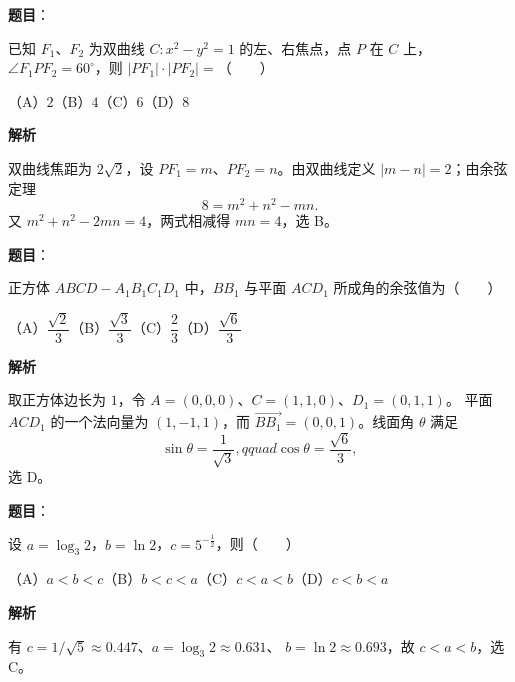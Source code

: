 \begin{answer}

\textbf{题目}：

已知 $F_1\text{、}F_2$ 为双曲线 $C:x^2-y^2=1$ 的左、右焦点，点 $P$ 在 $C$ 上，$\angle F_1PF_2=60^\circ$，则 $|PF_1|\cdot|PF_2|=$\mbox{（　　）}

（A）$2$\quad（B）$4$\quad（C）$6$\quad（D）$8$

\textbf{解析}

双曲线焦距为 $2\sqrt2$，设 $PF_1=m$、$PF_2=n$。由双曲线定义
$|m-n|=2$；由余弦定理
\nopagebreak[4]
\[
8=m^2+n^2-mn.
\]
又 $m^2+n^2-2mn=4$，两式相减得 $mn=4$，选 B。


\end{answer}
\begin{answer}

\textbf{题目}：

正方体 $ABCD-A_1B_1C_1D_1$ 中，$BB_1$ 与平面 $ACD_1$ 所成角的余弦值为\mbox{（　　）}

（A）$\dfrac{\sqrt2}{3}$\quad（B）$\dfrac{\sqrt3}{3}$\quad（C）$\dfrac23$\quad（D）$\dfrac{\sqrt6}{3}$

\textbf{解析}

取正方体边长为 $1$，令 $A=(0,0,0)$、$C=(1,1,0)$、$D_1=(0,1,1)$。
平面 $ACD_1$ 的一个法向量为 $(1,-1,1)$，而
$\overrightarrow{BB_1}=(0,0,1)$。线面角 $\theta$ 满足
\nopagebreak[4]
\[
\sin\theta=\frac1{\sqrt3},qquad \cos\theta=\frac{\sqrt6}{3},
\]
选 D。


\end{answer}
\begin{answer}

\textbf{题目}：

设 $a=\log_3 2$，$b=\ln2$，$c=5^{-\frac12}$，则\mbox{（　　）}

（A）$a<b<c$\quad（B）$b<c<a$\quad（C）$c<a<b$\quad（D）$c<b<a$

\textbf{解析}

有 $c=1/\sqrt5\approx0.447$、$a=\log_3 2\approx0.631$、
$b=\ln2\approx0.693$，故 $c<a<b$，选 C。


\end{answer}
